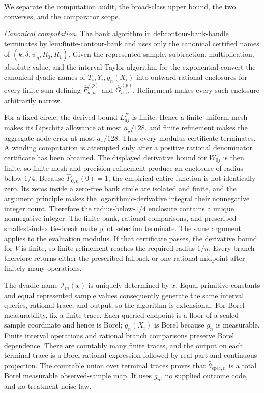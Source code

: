 We separate the computation audit, the broad-class upper bound, the two converses, and the comparator scope.

\emph{Canonical computation.}  The bank algorithm in \(\text{def:contour-bank-handle}\) terminates by \(\text{lem:finite-contour-bank}\) and uses only the canonical certified names of \((k,\delta,\psi_{\eta},R_0,R_1)\).  Given the represented sample, subtraction, multiplication, absolute value, and the interval Taylor algorithm for the exponential convert the canonical dyadic names of \(T_i,Y_i,\bar g_n(X_i)\) into outward rational enclosures for every finite sum defining \(\widehat F_{a,n}^{(p)}\) and \(\widehat G_{a,n}^{(p)}\).  Refinement makes every such enclosure arbitrarily narrow.

For a fixed circle, the derived bound \(L^F_{aj}\) is finite.  Hence a finite uniform mesh makes its Lipschitz allowance at most \(a_{\star}/128\), and finite refinement makes the aggregate node error at most \(a_{\star}/128\).  Thus every modulus certificate terminates.  A winding computation is attempted only after a positive rational denominator certificate has been obtained.  The displayed derivative bound for \(W_{0j}\) is then finite, so finite mesh and precision refinement produce an enclosure of radius below \(1/4\).  Because \(\widehat F_{0,n}(0)=1\), the empirical entire function is not identically zero.  Its zeros inside a zero-free bank circle are isolated and finite, and the argument principle makes the logarithmic-derivative integral their nonnegative integer count.  Therefore the radius-below-\(1/4\) enclosure contains a unique nonnegative integer.  The finite bank, rational comparisons, and prescribed smallest-index tie-break make pilot selection terminate.  The same argument applies to the evaluation modulus.  If that certificate passes, the derivative bound for \(V\) is finite, so finite refinement reaches the required radius \(1/n\).  Every branch therefore returns either the prescribed fallback or one rational midpoint after finitely many operations.

The dyadic name \(\mathcal I_m(x)\) is uniquely determined by \(x\).  Equal primitive constants and equal represented sample values consequently generate the same interval queries, rational trace, and output, so the algorithm is extensional.  For Borel measurability, fix a finite trace.  Each queried endpoint is a floor of a scaled sample coordinate and hence is Borel; \(\bar g_n(X_i)\) is Borel because \(\bar g_n\) is measurable.  Finite interval operations and rational branch comparisons preserve Borel dependence.  There are countably many finite traces, and the output on each terminal trace is a Borel rational expression followed by real part and continuous projection.  The countable union over terminal traces proves that \(\widehat\theta_{\mathrm{spec},n}\) is a total Borel measurable observed-sample map.  It uses \(\bar g_n\), no supplied outcome code, and no treatment-noise law.


